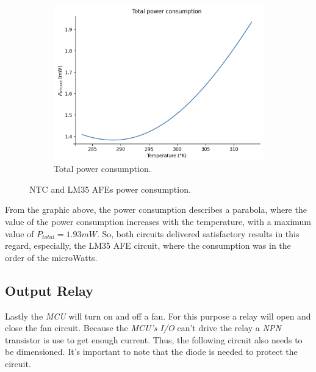 \documentclass[12pt]{article}
\begin{document}
\begin{figure}[H]
\begin{subfigure}{0.45\textwidth}
            \includegraphics*[scale = 0.35]{images/PowerTotal.png}
            \caption{Total power consumption.}
        \end{subfigure}
        \caption{NTC and LM35 AFEs power consumption.}
        \label{powerteo}
    \end{figure}
    
    From the graphic above, the power consumption describes a parabola, where the value of the power consumption increases with the temperature, with a maximum value of $P_{total} = 1.93 mW$. So, both circuits delivered satisfactory results in this regard, especially, the LM35 AFE circuit, where the consumption was in the order of the microWatts.

\subsection{Output Relay }
    
    Lastly the \textit{MCU} will turn on and off a fan. For this purpose 
    a relay will open and close the fan circuit. Because the \textit{MCU's I/O} 
    can't drive the relay a \textit{NPN} transistor is use to get enough current.
    Thus, the following circuit also needs to be dimensioned. It's important to note
    that the diode is needed to protect the circuit.
    
\end{document}

